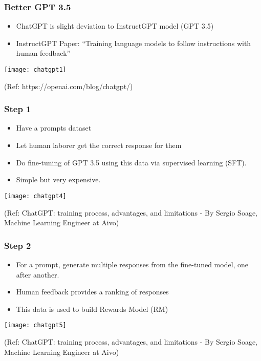 \begin{frame}[fragile]\frametitle{Better GPT 3.5}

\begin{itemize}
\item ChatGPT is slight deviation to InstructGPT model (GPT 3.5)
\item InstructGPT Paper: ``Training language models to follow instructions with human feedback''
\end{itemize}	 
			\begin{center}
			\texttt{[image: chatgpt1]}
			\end{center}		
			
			\tiny{(Ref: https://openai.com/blog/chatgpt/)}
\end{frame}

\begin{frame}[fragile]\frametitle{Step 1}

\begin{itemize}
\item Have a prompts dataset 
\item Let human laborer get the correct response for them
\item Do fine-tuning of GPT 3.5 using this data via supervised learning (SFT). 
\item Simple but very expensive.
\end{itemize}	 

			\begin{center}
			\texttt{[image: chatgpt4]}
			
			\end{center}		
			
			{\tiny (Ref: ChatGPT: training process, advantages, and limitations - By Sergio Soage, Machine Learning Engineer at Aivo)}
			
\end{frame}

\begin{frame}[fragile]\frametitle{Step 2}

\begin{itemize}
\item For a prompt, generate multiple responses from the fine-tuned model, one after another.
\item Human feedback provides a ranking of responses
\item This data is used to build Rewards Model (RM)
\end{itemize}	 

			\begin{center}
			\texttt{[image: chatgpt5]}
			
			\end{center}		
			
			{\tiny (Ref: ChatGPT: training process, advantages, and limitations - By Sergio Soage, Machine Learning Engineer at Aivo)}
			
\end{frame}


